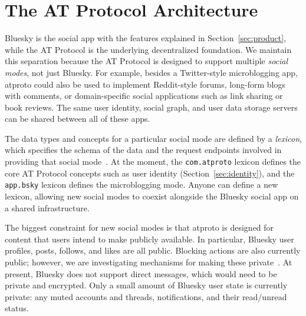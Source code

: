 \documentclass[sigconf,review]{acmart}
\begin{document}

\section{The AT Protocol Architecture}\label{sec:architecture}

Bluesky is the social app with the features explained in Section~\ref{sec:product}, while the AT Protocol is the underlying decentralized foundation.
We maintain this separation because the AT Protocol is designed to support multiple \emph{social modes}, not just Bluesky.
For example, besides a Twitter-style microblogging app, atproto could also be used to implement Reddit-style forums, long-form blogs with comments, or domain-specific social applications such as link sharing or book reviews.
The same user identity, social graph, and user data storage servers can be shared between all of these apps.

The data types and concepts for a particular social mode are defined by a \emph{lexicon}, which specifies the schema of the data and the request endpoints involved in providing that social mode~\cite{AtProtoSpecs}.
At the moment, the \texttt{com.atproto} lexicon defines the core AT Protocol concepts such as user identity (Section~\ref{sec:identity}), and the \texttt{app.bsky} lexicon defines the microblogging mode.
Anyone can define a new lexicon, allowing new social modes to coexist alongside the Bluesky social app on a shared infrastructure.

The biggest constraint for new social modes is that atproto is designed for content that users intend to make publicly available.
In particular, Bluesky user profiles, posts, follows, and likes are all public.
Blocking actions are also currently public; however, we are investigating mechanisms for making these private~\cite{PrivateBlocks}.
At present, Bluesky does not support direct messages, which would need to be private and encrypted.
Only a small amount of Bluesky user state is currently private: any muted accounts and threads, notifications, and their read/unread status.
\end{document}
